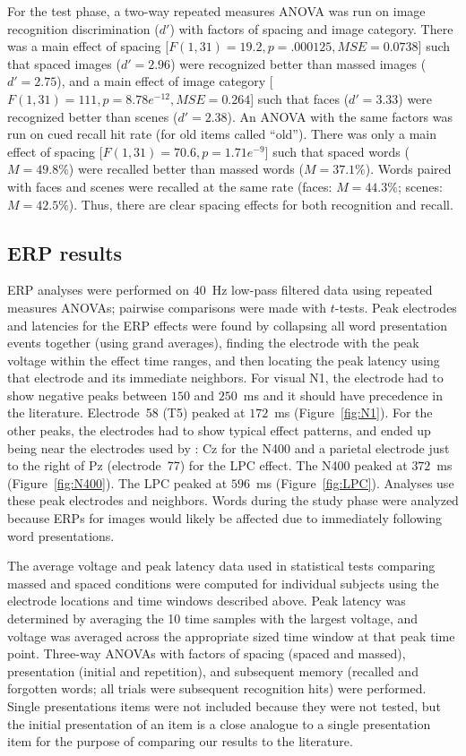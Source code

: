 For the test phase, a two-way repeated measures ANOVA was run on image recognition discrimination ($d'$) with factors of spacing and image category.  There was a main effect of spacing [$F(1,31)=19.2, p=.000125, MSE=0.0738$] such that spaced images ($d'=2.96$) were recognized better than massed images ($d'=2.75$), and a main effect of image category [$F(1,31)=111, p=8.78e^{-12}, MSE=0.264$] such that faces ($d'=3.33$) were recognized better than scenes ($d'=2.38$).  An ANOVA with the same factors was run on cued recall hit rate (for old items called ``old'').  There was only a main effect of spacing [$F(1,31)=70.6, p=1.71e^{-9}$] such that spaced words ($M=49.8\%$) were recalled better than massed words ($M=37.1\%$).  Words paired with faces and scenes were recalled at the same rate (faces: $M=44.3\%$; scenes: $M=42.5\%$).  Thus, there are clear spacing effects for both recognition and recall.

\subsection{ERP results}

ERP analyses were performed on $40$~Hz low-pass filtered data using repeated measures ANOVAs; pairwise comparisons were made with $t$-tests.  Peak electrodes and latencies for the ERP effects were found by collapsing all word presentation events together (using grand averages), finding the electrode with the peak voltage within the effect time ranges, and then locating the peak latency using that electrode and its immediate neighbors.  For visual N1, the electrode had to show negative peaks between $150$ and $250$~ms and it should have precedence in the literature.  Electrode~58 (T5) peaked at $172$~ms (Figure~\ref{fig:N1}).  For the other peaks, the electrodes had to show typical effect patterns, and ended up being near the electrodes used by : Cz for the N400 and a parietal electrode just to the right of Pz (electrode~77) for the LPC effect.  The N400 peaked at $372$~ms (Figure~\ref{fig:N400}).  The LPC peaked at $596$~ms (Figure~\ref{fig:LPC}).  Analyses use these peak electrodes and neighbors.  Words during the study phase were analyzed because ERPs for images would likely be affected due to immediately following word presentations.

The average voltage and peak latency data used in statistical tests comparing massed and spaced conditions were computed for individual subjects using the electrode locations and time windows described above.  Peak latency was determined by averaging the 10 time samples with the largest voltage, and voltage was averaged across the appropriate sized time window at that peak time point.
Three-way ANOVAs with factors of spacing (spaced and massed), presentation (initial and repetition), and subsequent memory (recalled and forgotten words; all trials were subsequent recognition hits) were performed.  Single presentations items were not included because they were not tested, but the initial presentation of an item is a close analogue to a single presentation item for the purpose of comparing our results to the literature.

